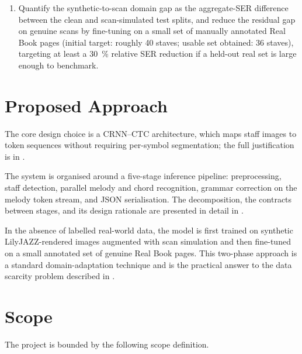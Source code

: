 \begin{enumerate}
    \item Quantify the synthetic-to-scan domain gap as the aggregate-SER difference
          between the clean and scan-simulated test splits, and reduce the residual gap
          on genuine scans by fine-tuning on a small set of manually annotated
          Real Book pages (initial target: roughly \num{40} staves; usable set
          obtained: \num{36} staves), targeting at
          least a \SI{30}{\percent} relative SER reduction if a held-out real
          set is large enough to benchmark.
\end{enumerate}

\section{Proposed Approach}
\label{sec:approach}

The core design choice is a CRNN--CTC architecture, which maps staff images to
token sequences without requiring per-symbol segmentation; the full justification
is in .

The system is organised around a five-stage inference pipeline: preprocessing,
staff detection, parallel melody and chord recognition, grammar correction on
the melody token stream, and JSON serialisation. The decomposition, the
contracts between stages, and its design rationale are presented in detail in
.

In the absence of labelled real-world data, the model is first trained on synthetic
LilyJAZZ-rendered images augmented with scan simulation and then fine-tuned on a small
annotated set of genuine Real Book pages. This two-phase approach is a standard
domain-adaptation technique and is the practical answer to the data scarcity problem
described in .

\section{Scope}
\label{sec:scope}

The project is bounded by the following scope definition.

